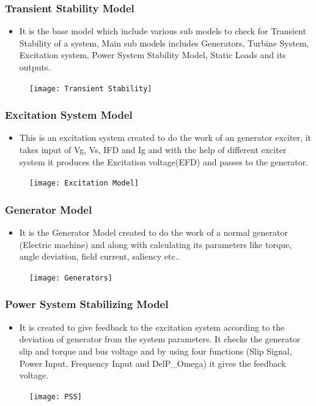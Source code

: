 \documentclass [xcolor=svgnames, t] {beamer}
\begin{document}
\begin{frame}
	\frametitle{Transient Stability Model}
	\begin{itemize} \justifying 
	\item It is the base model which include various sub models to check for Transient Stability of a system, Main sub models includes Generators, Turbine System, Excitation system, Power System Stability Model, Static Loads and its outputs.
	\end{itemize}
	\begin{figure}
	\texttt{[image: Transient Stability]}
	\end{figure}
	\end{frame} 
	
	\begin{frame}
	\frametitle{Excitation System Model}
	\begin{itemize} \justifying 
	\item This is an excitation system created to do the work of an generator exciter, it takes input of Vg, Vs, IFD and Ig and with the help of different exciter system it  produces the Excitation voltage(EFD) and passes to the generator.
	\end{itemize}
	\begin{figure}
	\texttt{[image: Excitation Model]}
	\end{figure}
	\end{frame} 
	
	\begin{frame}
	\frametitle{Generator Model}
	\begin{itemize} \justifying 
	\item It is the Generator Model created to do the work of a normal generator (Electric machine) and along with calculating its parameters like torque, angle deviation, field current, saliency etc..
	\end{itemize}
	\begin{figure}
	\texttt{[image: Generators]}
	\end{figure}
	\end{frame} 
	
	\begin{frame}
	\frametitle{Power System Stabilizing Model}
	\begin{itemize} \justifying 
	\item It is created to give feedback to the excitation system according to the deviation of generator from the system parameters. It checks the generator slip and torque and bus voltage and by using four functions (Slip Signal, Power Input, Frequency Input and DelP\_Omega) it gives the feedback voltage.
	\end{itemize}
	\begin{figure}
	\texttt{[image: PSS]}
	\end{figure}
	\end{frame} 
	
\end{document}
